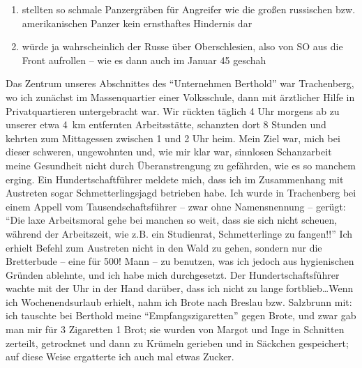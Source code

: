 \documentclass[a5paper,pagesize,10pt,twoside=true]{scrbook}
\renewcommand{\marginpar}[2][]{}
\begin{document}
\marginpar{43}
\begin{enumerate}
	\item stellten so schmale Panzergräben für Angreifer wie die großen russischen bzw. amerikanischen Panzer kein ernsthaftes Hindernis dar
	\item würde ja wahrscheinlich der Russe über Oberschlesien, also von SO aus die Front aufrollen -- wie es dann auch im Januar 45 geschah
\end{enumerate}

Das Zentrum unseres Abschnittes des \enquote{Unternehmen Berthold} war Trachenberg, wo ich zunächst im Massenquartier einer Volksschule, dann mit ärztlicher Hilfe in Privatquartieren untergebracht war. Wir rückten täglich 4 Uhr morgens ab zu unserer etwa 4~km entfernten Arbeitsstätte, schanzten dort 8 Stunden und kehrten zum Mittagessen zwischen 1 und 2 Uhr heim. Mein Ziel war, mich bei dieser schweren, ungewohnten und, wie mir klar war, sinnlosen Schanzarbeit meine Gesundheit nicht durch Überanstrengung zu gefährden, wie es so manchem erging. Ein Hundertschaftführer meldete mich, dass ich im Zusammenhang mit Austreten sogar Schmetterlingsjagd betrieben habe. Ich wurde in Trachenberg bei \marginpar{44} einem Appell vom Tausendschaftsführer -- zwar ohne Namensnennung -- gerügt: \enquote{Die laxe Arbeitsmoral gehe bei manchen so weit, dass sie sich nicht scheuen, während der Arbeitszeit, wie z.B. ein Studienrat, Schmetterlinge zu fangen!!} Ich erhielt Befehl zum Austreten nicht in den Wald zu gehen, sondern nur die Bretterbude -- eine für 500! Mann -- zu benutzen, was ich jedoch aus hygienischen Gründen ablehnte, und ich habe mich durchgesetzt. Der Hundertschaftsführer wachte mit der Uhr in der Hand darüber, dass ich nicht zu lange fortblieb\dots Wenn ich Wochenendsurlaub erhielt, nahm ich Brote nach Breslau bzw. Salzbrunn mit: ich tauschte bei Berthold meine \enquote{Empfangszigaretten} gegen Brote, und zwar gab man mir für 3 Zigaretten 1 Brot; sie wurden von Margot und Inge in Schnitten zerteilt, getrocknet und dann zu Krümeln gerieben und in Säckchen gespeichert; auf diese Weise ergatterte ich auch mal etwas Zucker.
\end{document}
